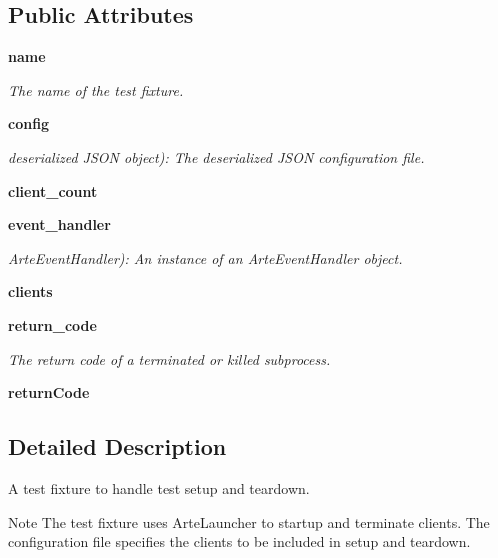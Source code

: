 \subsection*{Public Attributes}
\begin{DoxyCompactItemize}
\item 
{\bf name}
\begin{DoxyCompactList}\small\item\em The name of the test fixture. \end{DoxyCompactList}\item 
{\bf config}
\begin{DoxyCompactList}\small\item\em deserialized J\+S\+ON object)\+: The deserialized J\+S\+ON configuration file. \end{DoxyCompactList}\item 
{\bfseries client\+\_\+count}\label{classarte__test_1_1_arte_test_fixture_ac02585f8f6c1fa8cae84ac394002bc84}

\item 
{\bf event\+\_\+handler}
\begin{DoxyCompactList}\small\item\em Arte\+Event\+Handler)\+: An instance of an Arte\+Event\+Handler object. \end{DoxyCompactList}\item 
{\bfseries clients}\label{classarte__test_1_1_arte_test_fixture_a0ce25bc979d417989f0ae2d4d30e828b}

\item 
{\bf return\+\_\+code}\label{classarte__test_1_1_arte_test_fixture_a0d9a1e9ef871ed25068a91f2d693e6be}

\begin{DoxyCompactList}\small\item\em The return code of a terminated or killed subprocess. \end{DoxyCompactList}\item 
{\bfseries return\+Code}\label{classarte__test_1_1_arte_test_fixture_a27442f942d329a4d3b8ef348fabb79b6}

\end{DoxyCompactItemize}


\subsection{Detailed Description}
A test fixture to handle test setup and teardown. 

\begin{DoxyNote}{Note}
The test fixture uses Arte\+Launcher to startup and terminate clients. The configuration file specifies the clients to be included in setup and teardown.
\end{DoxyNote}

